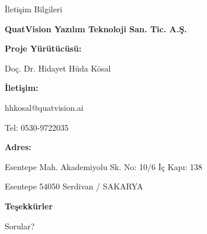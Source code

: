 \documentclass[aspectratio=169,xcolor={dvipsnames}]{beamer}
\begin{document}
\begin{frame}{İletişim Bilgileri}
\begin{center}
\Large{\textbf{QuatVision Yazılım Teknoloji San. Tic. A.Ş.}}


\vspace{1cm}

\textbf{Proje Yürütücüsü:}

Doç. Dr. Hidayet Hüda Kösal


\textbf{İletişim:}

hhkosal@quatvision.ai

Tel: 0530-9722035


\textbf{Adres:}

Esentepe Mah. Akademiyolu Sk. No: 10/6 İç Kapı: 138

Esentepe 54050 Serdivan / SAKARYA

\end{center}
\end{frame}

\begin{frame}
\Huge{\textbf{Teşekkürler}}

\vspace{1cm}

\Large{Sorular?}
\end{frame}
\end{document}
